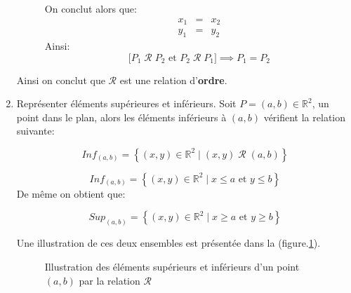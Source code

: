 \documentclass[12pt,a4paper,dvipsnames]{article}
\begin{document}
\begin{enumerate}
\begin{description}
        On conclut alors que:
        \begin{equation}
            \begin{array}{lll} x_1&= & x_2\\
            y_1&=&y_2\end{array}
        \end{equation}
        Ainsi:
        \begin{equation}
            \big[ P_1\;\mathcal{R}\; P_2 \text{ et }P_2\;\mathcal{R}\; P_1
            \big]\implies P_1 = P_2
        \end{equation}
\end{description}
Ainsi on conclut que $\mathcal{R}$ est une relation d'\textbf{ordre}.
\item Représenter éléments supérieures et inférieurs.
    Soit $P=(a,b)\in \mathbb{R}^2$, un point dans le plan, alors les éléments
    inférieurs à $(a,b)$ vérifient la relation suivante:

    \begin{equation}
        \label{eq:elem_inf}
         Inf_{(a,b)} =\left\{ (x,y)\in\mathbb{R}^2\;|\; (x,y)\;\mathcal{R}\;(a,b)\right\} 
    \end{equation}

    \begin{equation}
        \label{eq:elem_inf}
        Inf_{(a,b)} =\left\{ (x,y)\in\mathbb{R}^2\;|\; x\leq a\text{ et } y\leq
        b\right\} 
    \end{equation}
    De même on obtient que:

    \begin{equation}
        \label{eq:elem_sup}
        Sup_{(a,b)} =\left\{ (x,y)\in\mathbb{R}^2\;|\; x\geq a\text{ et } y\geq
        b\right\} 
    \end{equation}

    Une illustration de ces deux ensembles est présentée dans la
    (figure.\ref{fig:point_sup}).
\begin{figure}[htpb]
\begin{center}
\end{center}
\caption{Illustration des éléments supérieurs et inférieurs d'un point $(a,b)$
par la relation $\mathcal{R}$}%
\label{fig:point_sup}
\end{figure}


\end{enumerate}
\end{document}
